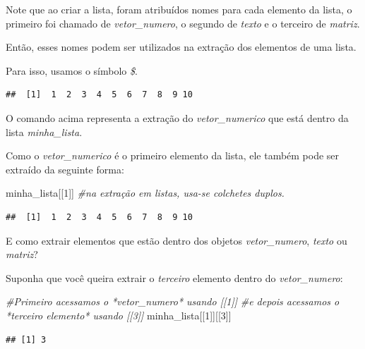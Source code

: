 \documentclass[
]{book}
\newenvironment{Shaded}{\begin{snugshade}}{\end{snugshade}}
\newcommand{\CommentTok}[1]{\textcolor[rgb]{0.56,0.35,0.01}{\textit{#1}}}
\newcommand{\DecValTok}[1]{\textcolor[rgb]{0.00,0.00,0.81}{#1}}
\newcommand{\NormalTok}[1]{#1}
\newcommand{\OperatorTok}[1]{\textcolor[rgb]{0.81,0.36,0.00}{\textbf{#1}}}
\begin{document}
Note que ao criar a lista, foram atribuídos nomes para cada elemento da
lista, o primeiro foi chamado de \emph{vetor\_numero}, o segundo de
\emph{texto} e o terceiro de \emph{matriz}.

Então, esses nomes podem ser utilizados na extração dos elementos de uma
lista.

Para isso, usamos o símbolo \emph{\$}.

\begin{Shaded}
\end{Shaded}

\begin{verbatim}
##  [1]  1  2  3  4  5  6  7  8  9 10
\end{verbatim}

O comando acima representa a extração do \emph{vetor\_numerico} que está
dentro da lista \emph{minha\_lista}.

Como o \emph{vetor\_numerico} é o primeiro elemento da lista, ele também
pode ser extraído da seguinte forma:

\begin{Shaded}
\begin{Highlighting}[]
\NormalTok{minha_lista[[}\DecValTok{1}\NormalTok{]]  }\CommentTok{#na extração em listas, usa-se colchetes duplos.}
\end{Highlighting}
\end{Shaded}

\begin{verbatim}
##  [1]  1  2  3  4  5  6  7  8  9 10
\end{verbatim}

E como extrair elementos que estão dentro dos objetos
\emph{vetor\_numero}, \emph{texto} ou \emph{matriz}?

Suponha que você queira extrair o \emph{terceiro} elemento dentro do
\emph{vetor\_numero}:

\begin{Shaded}
\begin{Highlighting}[]
\CommentTok{#Primeiro acessamos o *vetor_numero* usando [[1]]}
\CommentTok{#e depois acessamos o *terceiro elemento* usando [[3]]}
\NormalTok{minha_lista[[}\DecValTok{1}\NormalTok{]][[}\DecValTok{3}\NormalTok{]] }
\end{Highlighting}
\end{Shaded}

\begin{verbatim}
## [1] 3
\end{verbatim}
\end{document}
